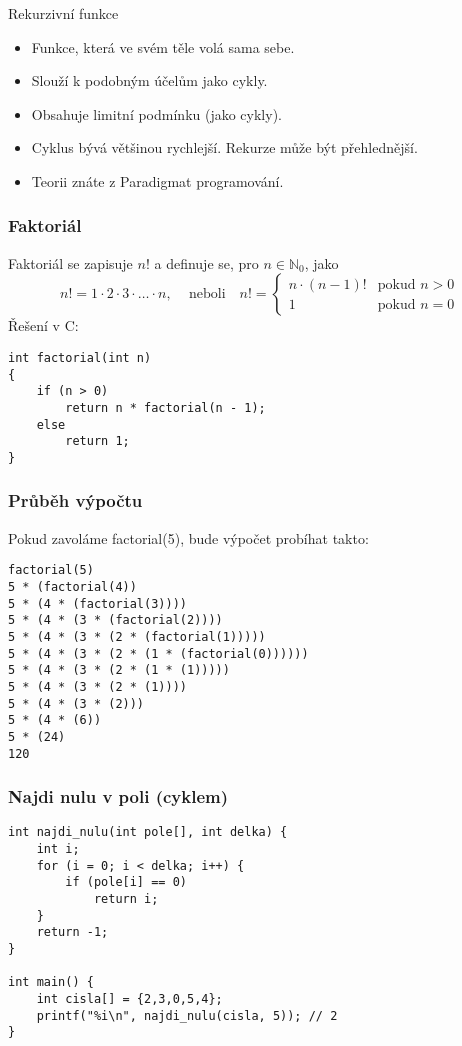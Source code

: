 \documentclass{beamer}
\newenvironment{itemizex}%
  {\large \begin{itemize}%
    \setlength{\itemsep}{8pt}%
    \setlength{\parskip}{8pt}}%
  {\end{itemize}}
\begin{document}
\begin{frame}[t,fragile]{Rekurzivní funkce}
\begin{itemizex}
    \item Funkce, která ve svém těle volá sama sebe. 
    \item Slouží k podobným účelům jako cykly.
    \item Obsahuje limitní podmínku (jako cykly). 
    \item Cyklus bývá většinou rychlejší. Rekurze může být přehlednější. 
    \item Teorii znáte z Paradigmat programování. 
  \end{itemizex}
\end{frame}


\begin{frame}[t,fragile]\frametitle{Faktoriál} 
Faktoriál se zapisuje $n!$ a definuje se, pro $n\in\mathbb{N}_0$, jako
$$n!=1\cdot2\cdot3\cdot\ldots\cdot n,\quad \,\mbox{neboli}\quad 
n!=
\begin{cases}
n\cdot(n-1)!&\mbox{pokud } n > 0\\
1&\mbox{pokud } n = 0
\end{cases}
$$
Řešení v C:
\begin{verbatim} 
int factorial(int n)
{
    if (n > 0)
        return n * factorial(n - 1);
    else
        return 1;
}
\end{verbatim}
\end{frame}


\begin{frame}[t,fragile]\frametitle{Průběh výpočtu} 
Pokud zavoláme factorial(5), bude výpočet probíhat takto:

\begin{verbatim} 
factorial(5)
5 * (factorial(4))
5 * (4 * (factorial(3))))
5 * (4 * (3 * (factorial(2))))
5 * (4 * (3 * (2 * (factorial(1)))))
5 * (4 * (3 * (2 * (1 * (factorial(0))))))
5 * (4 * (3 * (2 * (1 * (1)))))
5 * (4 * (3 * (2 * (1))))
5 * (4 * (3 * (2)))
5 * (4 * (6))
5 * (24)
120
\end{verbatim}
\end{frame}


\begin{frame}[t,fragile]\frametitle{Najdi nulu v poli (cyklem)} 
\begin{verbatim} 
int najdi_nulu(int pole[], int delka) {
    int i;
    for (i = 0; i < delka; i++) {
        if (pole[i] == 0)
            return i;
    }
    return -1;
}

int main() {
    int cisla[] = {2,3,0,5,4};
    printf("%i\n", najdi_nulu(cisla, 5)); // 2
}
\end{verbatim}
\end{frame}
\end{document}
